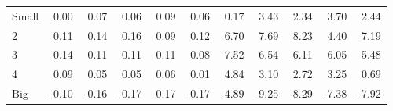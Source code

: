 \begin{table}[!ht]
\begin{tabular}{lrrrrrrrrrr}
    \\
      \cmidrule(r){2-6} \cmidrule(r){7-11}

    Small   & 0.00  & 0.07  & 0.06  & 0.09  & 0.06  & 0.17  & 3.43  & 2.34  & 3.70  & 2.44  \\
         2  & 0.11  & 0.14  & 0.16  & 0.09  & 0.12  & 6.70  & 7.69  & 8.23  & 4.40  & 7.19  \\
         3  & 0.14  & 0.11  & 0.11  & 0.11  & 0.08  & 7.52  & 6.54  & 6.11  & 6.05  & 5.48  \\
         4  & 0.09  & 0.05  & 0.05  & 0.06  & 0.01  & 4.84  & 3.10  & 2.72  & 3.25  & 0.69  \\
    Big     & -0.10  & -0.16  & -0.17  & -0.17  & -0.17  & -4.89  & -9.25  & -8.29  & -7.38  & -7.92  \\

  

  \bottomrule
\end{tabular}
\label{tbl:25_Size_Inv_C1997b}
\end{table}